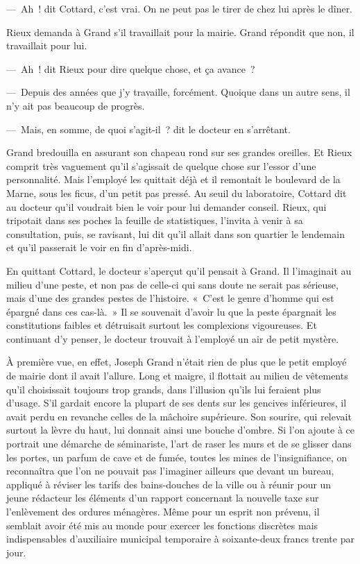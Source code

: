 \documentclass[french,twoside]{book} %
\begin{document}
— Ah ! dit Cottard, c’est vrai. On ne peut pas le tirer de chez lui après le dîner.\par
Rieux demanda à Grand s’il travaillait pour la mairie. Grand répondit que non, il travaillait pour lui.\par
— Ah ! dit Rieux pour dire quelque chose, et ça avance ?\par
— Depuis des années que j’y travaille, forcément. Quoique dans un autre sens, il n’y ait pas beaucoup de progrès.\par
— Mais, en somme, de quoi s’agit-il ? dit le docteur en s’arrêtant.\par
Grand bredouilla en assurant son chapeau rond sur ses grandes oreilles. Et Rieux comprit très vaguement qu’il s’agissait de quelque chose sur l’essor d’une personnalité. Mais l’employé les quittait déjà et il remontait le boulevard de la Marne, sous les ficus, d’un petit pas pressé. Au seuil du laboratoire, Cottard dit au docteur qu’il voudrait bien le voir pour lui demander conseil. Rieux, qui tripotait dans ses poches la feuille de statistiques, l’invita à venir à sa consultation, puis, se ravisant, lui dit qu’il allait dans son quartier le lendemain et qu’il passerait le voir en fin d’après-midi.\par
En quittant Cottard, le docteur s’aperçut qu’il pensait à Grand. Il l’imaginait au milieu d’une peste, et non pas de celle-ci qui sans doute ne serait pas sérieuse, mais d’une des grandes pestes de l’histoire. « C’est le genre d’homme qui est épargné dans ces cas-là. » Il se souvenait d’avoir lu que la peste épargnait les constitutions faibles et détruisait surtout les complexions vigoureuses. Et continuant d’y penser, le docteur trouvait à l’employé un air de petit mystère.\par
À première vue, en effet, Joseph Grand n’était rien de plus que le petit employé de mairie dont il avait l’allure. Long et maigre, il flottait au milieu de vêtements qu’il choisissait toujours trop grands, dans l’illusion qu’ils lui feraient plus d’usage. S’il gardait encore la plupart de ses dents sur les gencives inférieures, il avait perdu en revanche celles de la mâchoire supérieure. Son sourire, qui relevait surtout la lèvre du haut, lui donnait ainsi une bouche d’ombre. Si l’on ajoute à ce portrait une démarche de séminariste, l’art de raser les murs et de se glisser dans les portes, un parfum de cave et de fumée, toutes les mines de l’insignifiance, on reconnaîtra que l’on ne pouvait pas l’imaginer ailleurs que devant un bureau, appliqué à réviser les tarifs des bains-douches de la ville ou à réunir pour un jeune rédacteur les éléments d’un rapport concernant la nouvelle taxe sur l’enlèvement des ordures ménagères. Même pour un esprit non prévenu, il semblait avoir été mis au monde pour exercer les fonctions discrètes mais indispensables d’auxiliaire municipal temporaire à soixante-deux francs trente par jour.\par
\end{document}
